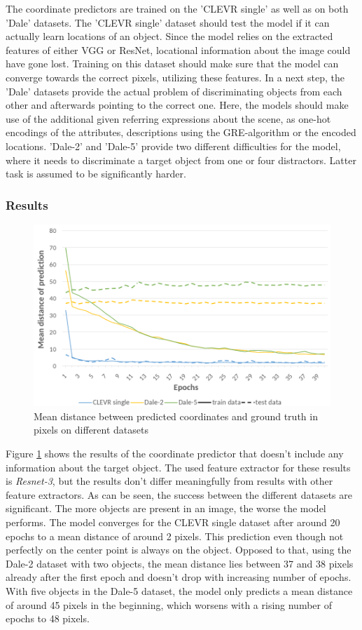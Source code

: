The coordinate predictors are trained on the 'CLEVR single' as well as on both 'Dale' datasets.
The 'CLEVR single' dataset should test the model if it can actually learn locations of an object.
Since the model relies on the extracted features of either VGG or ResNet, locational information about the image could have gone lost.
Training on this dataset should make sure that the model can converge towards the correct pixels, utilizing these features.
In a next step, the 'Dale' datasets provide the actual problem of discriminating objects from each other and afterwards pointing to the correct one.
Here, the models should make use of the additional given referring expressions about the scene, as one-hot encodings of the attributes, descriptions using the GRE-algorithm or the encoded locations.
'Dale-2' and 'Dale-5' provide two different difficulties for the model, where it needs to discriminate a target object from one or four distractors.
Latter task is assumed to be significantly harder.

\subsubsection*{Results}

\begin{figure}[h]
    \centering
    \includegraphics[width=0.8\linewidth]{figures/coordinate-predictor_loss.png}
    \caption{Mean distance between predicted coordinates and ground truth in pixels on different datasets}
    \label{fig:coordinate-predictor_loss}
\end{figure}

Figure \ref{fig:coordinate-predictor_loss} shows the results of the coordinate predictor that doesn't include any information about the target object.
The used feature extractor for these results is \emph{Resnet-3}, but the results don't differ meaningfully from results with other feature extractors.
As can be seen, the success between the different datasets are significant.
The more objects are present in an image, the worse the model performs.
The model converges for the CLEVR single dataset after around 20 epochs to a mean distance of around 2 pixels.
This prediction even though not perfectly on the center point is always on the object.
Opposed to that, using the Dale-2 dataset with two objects, the mean distance lies between 37 and 38 pixels already after the first epoch and doesn't drop with increasing number of epochs.
With five objects in the Dale-5 dataset, the model only predicts a mean distance of around 45 pixels in the beginning, which worsens with a rising number of epochs to 48 pixels.

